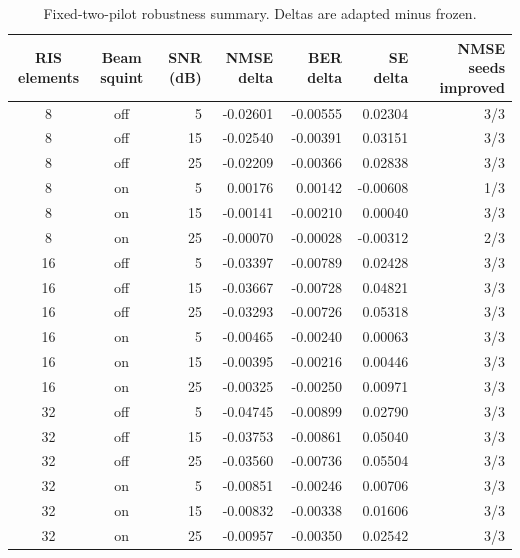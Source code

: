 \begin{table}[t]
\centering
\caption{Fixed-two-pilot robustness summary. Deltas are adapted minus frozen.}
\label{tab:r020}
\begin{tabular}{ccrrrrr}
\toprule
RIS elements & Beam squint & SNR (dB) & NMSE delta & BER delta & SE delta & NMSE seeds improved\\
\midrule
8 & off & 5 & -0.02601 & -0.00555 & 0.02304 & 3/3\\
8 & off & 15 & -0.02540 & -0.00391 & 0.03151 & 3/3\\
8 & off & 25 & -0.02209 & -0.00366 & 0.02838 & 3/3\\
8 & on & 5 & 0.00176 & 0.00142 & -0.00608 & 1/3\\
8 & on & 15 & -0.00141 & -0.00210 & 0.00040 & 3/3\\
8 & on & 25 & -0.00070 & -0.00028 & -0.00312 & 2/3\\
16 & off & 5 & -0.03397 & -0.00789 & 0.02428 & 3/3\\
16 & off & 15 & -0.03667 & -0.00728 & 0.04821 & 3/3\\
16 & off & 25 & -0.03293 & -0.00726 & 0.05318 & 3/3\\
16 & on & 5 & -0.00465 & -0.00240 & 0.00063 & 3/3\\
16 & on & 15 & -0.00395 & -0.00216 & 0.00446 & 3/3\\
16 & on & 25 & -0.00325 & -0.00250 & 0.00971 & 3/3\\
32 & off & 5 & -0.04745 & -0.00899 & 0.02790 & 3/3\\
32 & off & 15 & -0.03753 & -0.00861 & 0.05040 & 3/3\\
32 & off & 25 & -0.03560 & -0.00736 & 0.05504 & 3/3\\
32 & on & 5 & -0.00851 & -0.00246 & 0.00706 & 3/3\\
32 & on & 15 & -0.00832 & -0.00338 & 0.01606 & 3/3\\
32 & on & 25 & -0.00957 & -0.00350 & 0.02542 & 3/3\\
\bottomrule
\end{tabular}
\end{table}
